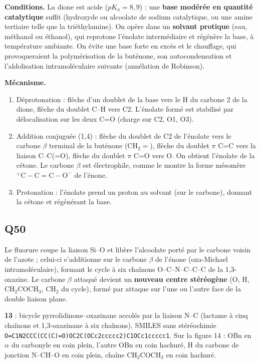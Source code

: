 \documentclass[11pt,a4paper]{article}
\providecommand{\tightlist}{\setlength{\itemsep}{0pt}\setlength{\parskip}{0pt}}
\begin{document}
\textbf{Conditions.} La dione est acide (\(pK_a=8{,}9\)) : une \textbf{base modérée en quantité catalytique} suffit (hydroxyde ou alcoolate de sodium catalytique, ou une amine tertiaire telle que la triéthylamine). On opère dans un \textbf{solvant protique} (eau, méthanol ou éthanol), qui reprotone l'énolate intermédiaire et régénère la base, à température ambiante. On évite une base forte en excès et le chauffage, qui provoqueraient la polymérisation de la buténone, son autocondensation et l'aldolisation intramoléculaire suivante (annélation de Robinson).

\textbf{Mécanisme.}

\begin{enumerate}
\def\labelenumi{\arabic{enumi}.}
\tightlist
\item
  Déprotonation : flèche d'un doublet de la base vers le H du carbone 2 de la dione, flèche du doublet C--H vers C2. L'énolate formé est stabilisé par délocalisation sur les deux C=O (charge sur C2, O1, O3).
\item
  Addition conjuguée (1,4) : flèche du doublet de C2 de l'énolate vers le carbone \(\beta\) terminal de la buténone (\(\mathrm{CH_2{=}}\)), flèche du doublet \(\pi\) C=C vers la liaison C--C(=O), flèche du doublet \(\pi\) C=O vers O. On obtient l'énolate de la cétone. Le carbone \(\beta\) est électrophile, comme le montre la forme mésomère \(\mathrm{{}^+C{-}C{=}C{-}O^-}\) de l'énone.
\item
  Protonation : l'énolate prend un proton au solvant (sur le carbone), donnant la cétone et régénérant la base.
\end{enumerate}

\hypertarget{q50}{%
\subsection{Q50}\label{q50}}

Le fluorure coupe la liaison Si--O et libère l'alcoolate porté par le carbone voisin de l'azote ; celui-ci s'additionne sur le carbone \(\beta\) de l'énone (oxa-Michael intramoléculaire), formant le cycle à six chaînons O--C--N--C--C--C de la 1,3-oxazine. Le carbone \(\beta\) attaqué devient un \textbf{nouveau centre stéréogène} (O, H, \(\mathrm{CH_2COCH_3}\), \(\mathrm{CH_2}\) du cycle), formé par attaque sur l'une ou l'autre face de la double liaison plane.

\textbf{13} : bicycle pyrrolidinone--oxazinane accolés par la liaison N--C (lactame à cinq chaînons et 1,3-oxazinane à six chaînons), SMILES sans stéréochimie \texttt{O=\allowbreak{}C1N2CCC(\allowbreak{}CC(\allowbreak{}C)\allowbreak{}=\allowbreak{}O)\allowbreak{}OC2C(\allowbreak{}OCc2ccccc2)\allowbreak{}C1OCc1ccccc1}. Sur la figure 14 : OBn en \(\alpha\) du carbonyle en coin plein, l'autre OBn en coin hachuré, H du carbone de jonction N--CH--O en coin plein, chaîne \(\mathrm{CH_2COCH_3}\) en coin hachuré.
\end{document}
